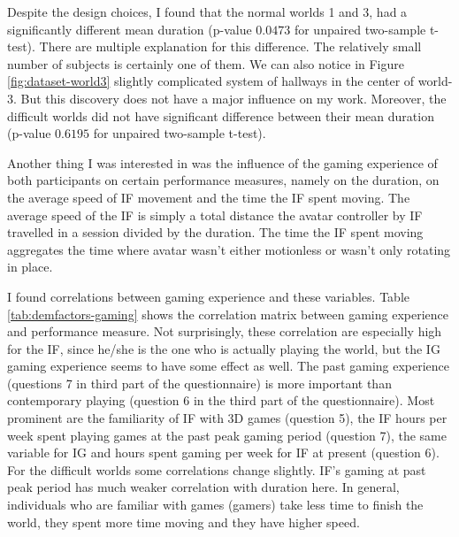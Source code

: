 Despite the design choices, I found that the normal worlds 1 and 3, had a significantly different mean duration (p-value $0.0473$ for unpaired two-sample t-test). There are multiple explanation for this difference. The relatively small number of subjects is certainly one of them. We can also notice in Figure \ref{fig:dataset-world3} slightly complicated system of hallways in the center of world-3. But this discovery does not have a major influence on my work. Moreover, the difficult worlds did not have significant difference between their mean duration (p-value $0.6195$ for unpaired two-sample t-test).

Another thing I was interested in was the influence of the gaming experience of both participants on certain performance measures, namely on the duration, on the average speed of IF movement and the time the IF spent moving. The average speed of the IF is simply a total distance the avatar controller by IF travelled in a session divided by the duration. The time the IF spent moving aggregates the time where avatar wasn't either motionless or wasn't only rotating in place. 

I found correlations between gaming experience and these variables. Table \ref{tab:demfactors-gaming} shows the correlation matrix between gaming experience and performance measure.  Not surprisingly, these correlation are especially high for the IF, since he/she is the one who is actually playing the world, but the IG gaming experience seems to have some effect as well. The past gaming experience (questions 7 in third part of the questionnaire) is more important than contemporary playing (question 6 in the third part of the questionnaire). Most prominent are the familiarity of IF with 3D games (question 5),  the IF hours per week spent playing games at the past peak gaming period (question 7), the same variable for IG and hours spent gaming per week for IF at present (question 6). For the difficult worlds some correlations change slightly. IF's gaming at past peak period has much weaker correlation with duration here. In general, individuals who are familiar with games (gamers) take less time to finish the world, they spent more time moving and they have higher speed.


